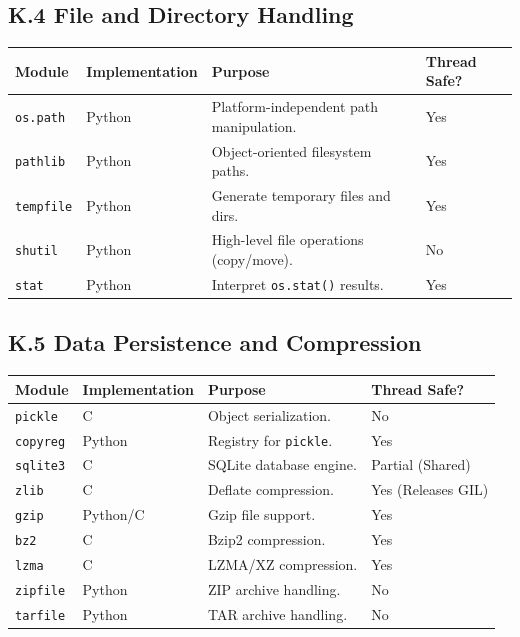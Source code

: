 \hypertarget{k.4-file-and-directory-handling}{%
\subsection{K.4 File and Directory
Handling}\label{k.4-file-and-directory-handling}}

\begin{longtable}[]{@{}llll@{}}
\toprule
Module & Implementation & Purpose & Thread Safe? \\
\midrule
\endhead
\passthrough{\lstinline!os.path!} & Python & Platform-independent path
manipulation. & Yes \\
\passthrough{\lstinline!pathlib!} & Python & Object-oriented filesystem
paths. & Yes \\
\passthrough{\lstinline!tempfile!} & Python & Generate temporary files
and dirs. & Yes \\
\passthrough{\lstinline!shutil!} & Python & High-level file operations
(copy/move). & No \\
\passthrough{\lstinline!stat!} & Python & Interpret
\passthrough{\lstinline!os.stat()!} results. & Yes \\
\bottomrule
\end{longtable}

\hypertarget{k.5-data-persistence-and-compression}{%
\subsection{K.5 Data Persistence and
Compression}\label{k.5-data-persistence-and-compression}}

\begin{longtable}[]{@{}llll@{}}
\toprule
Module & Implementation & Purpose & Thread Safe? \\
\midrule
\endhead
\passthrough{\lstinline!pickle!} & C & Object serialization. & No \\
\passthrough{\lstinline!copyreg!} & Python & Registry for
\passthrough{\lstinline!pickle!}. & Yes \\
\passthrough{\lstinline!sqlite3!} & C & SQLite database engine. &
Partial (Shared) \\
\passthrough{\lstinline!zlib!} & C & Deflate compression. & Yes
(Releases GIL) \\
\passthrough{\lstinline!gzip!} & Python/C & Gzip file support. & Yes \\
\passthrough{\lstinline!bz2!} & C & Bzip2 compression. & Yes \\
\passthrough{\lstinline!lzma!} & C & LZMA/XZ compression. & Yes \\
\passthrough{\lstinline!zipfile!} & Python & ZIP archive handling. &
No \\
\passthrough{\lstinline!tarfile!} & Python & TAR archive handling. &
No \\
\bottomrule
\end{longtable}

